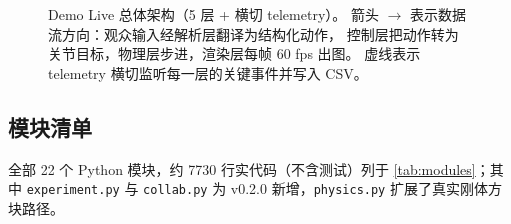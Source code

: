 \documentclass[12pt, a4paper, UTF8]{ctexart}
\begin{document}
\begin{figure}[h]
\caption{Demo Live 总体架构（5 层 + 横切 telemetry）。
箭头 $\to$ 表示数据流方向：观众输入经解析层翻译为结构化动作，
控制层把动作转为关节目标，物理层步进，渲染层每帧 60 fps 出图。
虚线表示 telemetry 横切监听每一层的关键事件并写入 CSV。}
\label{fig:arch}
\end{figure}

\subsection{模块清单}
全部 22 个 Python 模块，约 7730 行实代码（不含测试）列于
\autoref{tab:modules}；其中 \texttt{experiment.py} 与
\texttt{collab.py} 为 v0.2.0 新增，\texttt{physics.py} 扩展了真实刚体方块路径。
\end{document}

